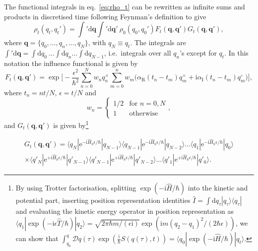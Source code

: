 The functional integrals in eq.~\ref{eq:rho_t} can be rewritten as infinite sums and products in discretised time following Feynman's definition\supercite{Feynman2010} to give
\begin{equation}
\rho_t(q_t,q_t')=
\int'\mathrm{d}\bm{q} 
\int'\mathrm{d}\bm{q}'
\ \rho_0(q_0,q_0')F_t(\bm{q},\bm{q}') G_t(\bm{q},\bm{q}'),
\end{equation}
where $\bm{q} = \{q_0, \dots, q_n, \dots, q_N\}$, with $q_N\equiv q_t$. The integrals are $\int'\mathrm{d}\bm{q} = \int\mathrm{d}q_0\ \dots \int\mathrm{d}q_n \dots \int\mathrm{d}q_{N-1}$, i.e.~integrals over all $q_n$'s except for $q_t$. In this notation the influence functional is given by
\begin{equation}
F_t(\bm{q},\bm{q}') = \exp\biggl[-\frac{\epsilon^2}{\hbar^2} 
\sum_{n=0}^N w_n q_n^\times
\sum_{m=0}^{n} w_m
\biggl(\alpha_\mathrm{R}(t_n-t_m)q_m^\times+\mathrm{i}\alpha_\mathrm{I}(t_n-t_m)q_m^\circ\biggr)\biggr],
\end{equation}
where $t_n=nt/N$, $\epsilon=t/N$ and
\begin{equation}
	w_n = 
	\begin{cases} 
	1/2 & \text{for }n=0,N \\
	1 & \text{otherwise}
	\end{cases},
\end{equation}
and $G_t(\bm{q},\bm{q}')$ is given by\footnote[2]{By using Trotter factorisation, splitting $\exp(-\mathrm{i}\hat{H}/\hbar)$ into the kinetic and potential part, inserting position representation identities $\hat{I}=\int\mathrm{d}q_\tau |q_\tau\rangle\langle q_\tau|$ and evaluating the kinetic energy operator in position representation as $\langle q_1|\exp(-\mathrm{i}\epsilon \hat{T}/\hbar)|q_2\rangle = \sqrt{2\pi\hbar m/(\epsilon\mathrm{i})}\exp(\mathrm{i}m(q_2-q_1)^2/(2\hbar\epsilon))$, we can show that $\int_{q_0}^{q}\mathcal{D}q(\tau)\exp(\frac{\mathrm{i}}{\hbar}S(q(\tau),t))=\langle q_0|\exp(-\mathrm{i}\hat{H}/\hbar)|q_t\rangle$.}


\begin{multline}
	G_t(\bm{q},\bm{q}') =
	\langle q_N|\mathrm{e}^{-\mathrm{i}\hat{H}_\mathrm{S}\epsilon/\hbar}|q_{N-1}\rangle
	\langle q_{N-1}|\mathrm{e}^{-\mathrm{i}\hat{H}_\mathrm{S}\epsilon/\hbar}|q_{N-2}\rangle
	\dots
	\langle q_1|\mathrm{e}^{-\mathrm{i}\hat{H}_\mathrm{S}\epsilon/\hbar}|q_0\rangle \\
	\times
	\langle q'_N|\mathrm{e}^{+\mathrm{i}\hat{H}_\mathrm{S}\epsilon/\hbar}|q'_{N-1}\rangle
	\langle q'_{N-1}|\mathrm{e}^{+\mathrm{i}\hat{H}_\mathrm{S}\epsilon/\hbar}|q'_{N-2}\rangle
	\dots
	\langle q'_1|\mathrm{e}^{+\mathrm{i}\hat{H}_\mathrm{S}\epsilon/\hbar}|q'_0\rangle.
\end{multline}
